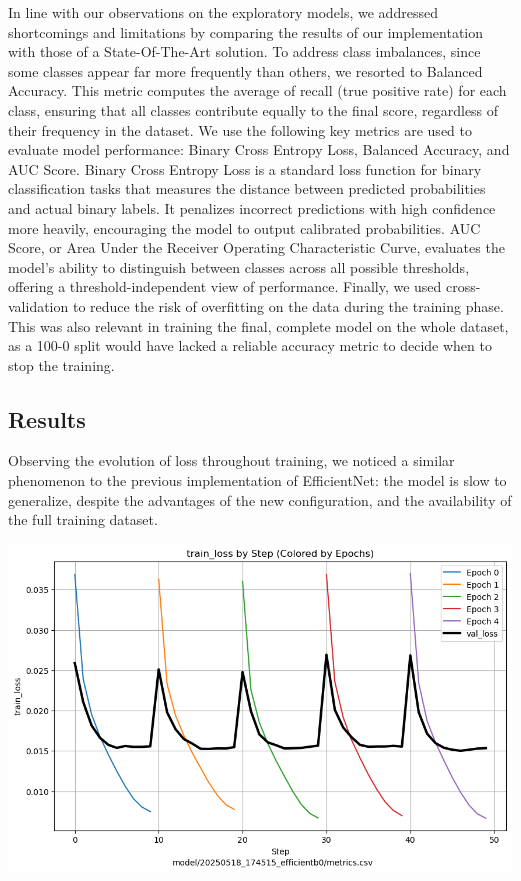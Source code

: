 \documentclass[10pt]{article}
\begin{document}
In line with our observations on the exploratory models, we addressed shortcomings and limitations by comparing the results of our implementation with those of a State-Of-The-Art solution. To address class imbalances, since some classes appear far more frequently than others, we resorted to Balanced Accuracy. This metric computes the average of recall (true positive rate) for each class, ensuring that all classes contribute equally to the final score, regardless of their frequency in the dataset. We use the following key metrics are used to evaluate model performance: Binary Cross Entropy Loss, Balanced Accuracy, and AUC Score. Binary Cross Entropy Loss is a standard loss function for binary classification tasks that measures the distance between predicted probabilities and actual binary labels. It penalizes incorrect predictions with high confidence more heavily, encouraging the model to output calibrated probabilities. AUC Score, or Area Under the Receiver Operating Characteristic Curve, evaluates the model's ability to distinguish between classes across all possible thresholds, offering a threshold-independent view of performance. Finally, we used cross-validation to reduce the risk of overfitting on the data during the training phase. This was also relevant in training the final, complete model on the whole dataset, as a 100-0 split would have lacked a reliable accuracy metric to decide when to stop the training.

\subsection*{Results}

\begin{minipage}{0.60\linewidth}
Observing the evolution of loss throughout training, we noticed a similar phenomenon to the previous implementation of EfficientNet: the model is slow to generalize, despite the advantages of the new configuration, and the availability of the full training dataset.
\end{minipage}
\hfill
\begin{minipage}{0.35\linewidth}
  \includegraphics[width=\linewidth]{img/efficientb_loss_kfold.png}
\end{minipage}
\end{document}
